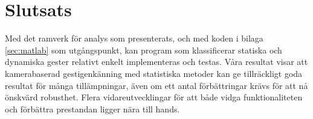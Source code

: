 \documentclass[../rapport_MVEX01-11-05]{subfiles}
\begin{document}
\section{Slutsats}
Med det ramverk för analys som presenterats, och med koden i bilaga
\ref{sec:matlab} som utgångspunkt, kan program som klassificerar
statiska och dynamiska gester relativt enkelt
implementeras och testas. Våra resultat visar att kamerabaserad
gestigenkänning med statistiska metoder kan ge tillräckligt goda resultat
för många tillämpningar, även om ett antal förbättringar krävs för att
nå önskvärd robusthet.
Flera vidareutvecklingar för att både vidga
funktionaliteten och förbättra prestandan ligger nära till hands.
\end{document}
